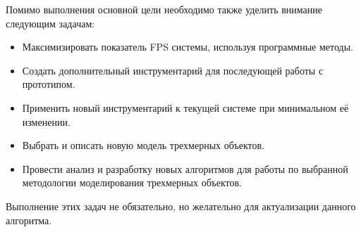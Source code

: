 Помимо выполнения основной цели необходимо также уделить внимание следующим задачам:

\begin{itemize}
	\item Максимизировать показатель FPS системы, используя программные методы.
	\item Создать дополнительный инструментарий для последующей работы с прототипом.
	\item Применить новый инструментарий к текущей системе при минимальном её изменении.
	\item Выбрать и описать новую модель трехмерных объектов.
	\item Провести анализ и разработку новых алгоритмов для работы по выбранной методологии моделирования трехмерных объектов.
\end{itemize}

Выполнение этих задач не обязательно, но желательно для актуализации данного алгоритма.
